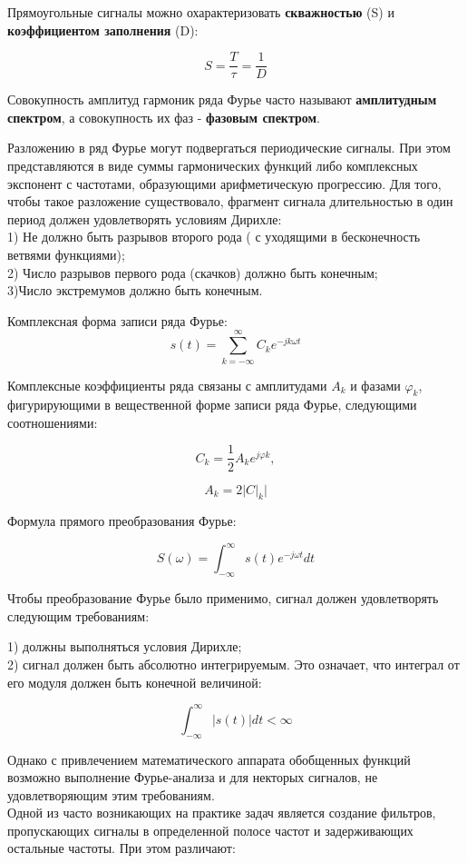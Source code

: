\documentclass[12pt,a4paper]{scrartcl}
\begin{document}
Прямоугольные сигналы можно охарактеризовать \textbf{скважностью} (S) и \textbf{коэффициентом заполнения} (D):

$$S=\frac{T}{\tau}=\frac{1}{D}$$

Совокупность амплитуд гармоник ряда Фурье часто называют \textbf{амплитудным спектром}, а совокупность их фаз - \textbf{фазовым спектром}.

Разложению в ряд Фурье могут подвергаться периодические сигналы. При этом представляются в виде суммы гармонических функций либо комплексных экспонент с частотами, образующими арифметическую прогрессию. Для того, чтобы такое разложение существовало, фрагмент сигнала длительностью в один период должен удовлетворять условиям Дирихле:\\
1) Не должно быть разрывов второго рода ( с уходящими в бесконечность ветвями функциями);\\
2) Число разрывов первого рода (скачков) должно быть конечным;\\
3)Число экстремумов должно быть конечным.

Комплексная форма записи ряда Фурье:
$$s(t)=\sum_{k=-\infty}^\infty C_k e^{-jk\omega t}$$

Комплексные коэффициенты ряда связаны с амплитудами $A_k$ и фазами $\varphi _k$, фигурирующими в вещественной форме записи ряда Фурье, следующими соотношениями:

$$C_k = \frac{1}{2}A_k e^{j\varphi k},$$

$$A_k = 2|C|_k|$$

Формула прямого преобразования Фурье:

$$S(\omega) = \int_{-\infty}^\infty s(t) e^{-j\omega t} dt$$

Чтобы преобразование Фурье было применимо, сигнал должен удовлетворять следующим требованиям:

1) должны выполняться условия Дирихле;\\
2) сигнал должен быть абсолютно интегрируемым. Это означает, что интеграл от его модуля должен быть конечной величиной:

$$\int_{-\infty}^\infty|s(t)|dt<\infty$$

Однако с привлечением математического аппарата обобщенных функций возможно выполнение Фурье-анализа и для некторых сигналов, не удовлетворяющим этим требованиям.
\\

Одной из часто возникающих на практике задач является создание фильтров,
пропускающих сигналы в определенной полосе частот и задерживающих остальные
частоты. При этом различают:
\end{document}
